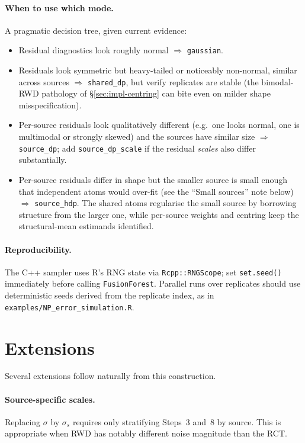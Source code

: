 \documentclass[11pt]{article}
\theoremstyle{plain}
\theoremstyle{definition}
\theoremstyle{remark}
\newcommand{\1}{\mathds{1}}
\begin{document}
\paragraph{When to use which mode.} A pragmatic decision tree, given current evidence:
\begin{itemize}[noitemsep]
  \item Residual diagnostics look roughly normal $\Rightarrow$ \texttt{gaussian}.
  \item Residuals look symmetric but heavy-tailed or noticeably non-normal, similar across sources $\Rightarrow$ \texttt{shared\_dp}, but verify replicates are stable (the bimodal-RWD pathology of \S\ref{sec:impl-centring} can bite even on milder shape misspecification).
  \item Per-source residuals look qualitatively different (e.g.\ one looks normal, one is multimodal or strongly skewed) and the sources have similar size $\Rightarrow$ \texttt{source\_dp}; add \texttt{source\_dp\_scale} if the residual \emph{scales} also differ substantially.
  \item Per-source residuals differ in shape but the smaller source is small enough that independent atoms would over-fit (see the ``Small sources'' note below) $\Rightarrow$ \texttt{source\_hdp}. The shared atoms regularise the small source by borrowing structure from the larger one, while per-source weights and centring keep the structural-mean estimands identified.
\end{itemize}

\paragraph{Reproducibility.} The C++ sampler uses R's RNG state via \texttt{Rcpp::RNGScope}; set \texttt{set.seed()} immediately before calling \texttt{FusionForest}. Parallel runs over replicates should use deterministic seeds derived from the replicate index, as in \texttt{examples/NP\_error\_simulation.R}.

\section{Extensions}\label{sec:extensions}

Several extensions follow naturally from this construction.

\paragraph{Source-specific scales.} Replacing $\sigma$ by $\sigma_s$ requires only stratifying Steps~3 and~8 by source. This is appropriate when RWD has notably different noise magnitude than the RCT.
\end{document}
